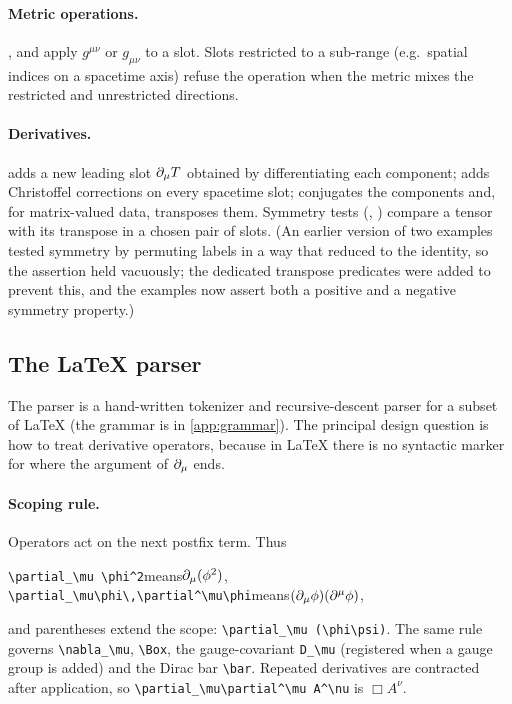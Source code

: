 \paragraph{Metric operations.} ,  and  apply $g^{\mu\nu}$ or $g_{\mu\nu}$ to a slot. Slots restricted to a sub-range (e.g.\ spatial indices on a spacetime axis) refuse the operation when the metric mixes the restricted and unrestricted directions.

\paragraph{Derivatives.}  adds a new leading slot $\partial_\mu T$ obtained by differentiating each component;  adds Christoffel corrections on every spacetime slot;  conjugates the components and, for matrix-valued data, transposes them. Symmetry tests (, ) compare a tensor with its transpose in a chosen pair of slots. (An earlier version of two examples tested symmetry by permuting labels in a way that reduced to the identity, so the assertion held vacuously; the dedicated transpose predicates were added to prevent this, and the examples now assert both a positive and a negative symmetry property.)

\sloppy\subsection{The \LaTeX{} parser}
\label{sec:parser}

The parser is a hand-written tokenizer and recursive-descent parser for a subset of \LaTeX{} (the grammar is in \cref{app:grammar}). The principal design question is how to treat derivative operators, because in \LaTeX{} there is no syntactic marker for where the argument of $\partial_\mu$ ends.

\paragraph{Scoping rule.} Operators act on the next postfix term. Thus
\begin{center}
\verb|\partial_\mu \phi^2|\quad means\quad $\partial_\mu(\phi^2)$,\qquad
\verb|\partial_\mu\phi\,\partial^\mu\phi|\quad means\quad $(\partial_\mu\phi)(\partial^\mu\phi)$,
\end{center}
and parentheses extend the scope: \verb|\partial_\mu (\phi\psi)|. The same rule governs \verb|\nabla_\mu|, \verb|\Box|, the gauge-covariant \verb|D_\mu| (registered when a gauge group is added) and the Dirac bar \verb|\bar|. Repeated derivatives are contracted after application, so \verb|\partial_\mu\partial^\mu A^\nu| is $\Box A^\nu$.

